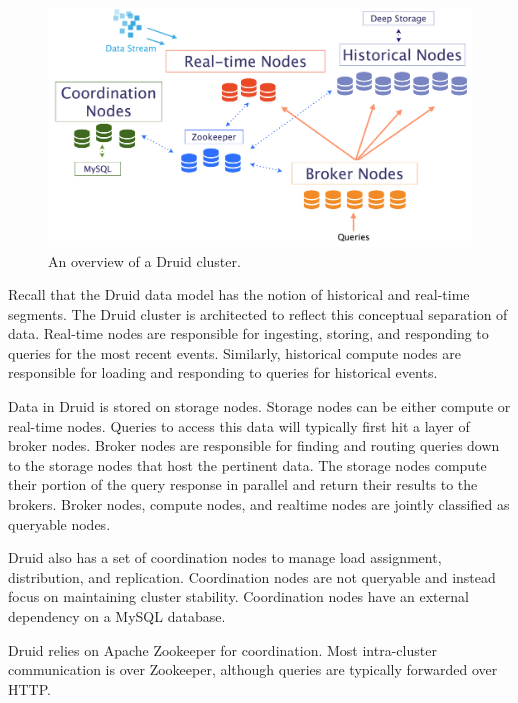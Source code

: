 \documentclass{vldb}
\begin{document}
\begin{figure}
\centering
\includegraphics[width = 4.5in]{druid_cluster}
\caption{An overview of a Druid cluster.}
\label{fig:druid_cluster}
\end{figure}

Recall that the Druid data model has the notion of historical and real-time segments. The Druid cluster is architected to reflect this
conceptual separation of data. Real-time nodes are responsible for
ingesting, storing, and responding to queries for the most recent
events. Similarly, historical compute nodes are responsible for
loading and responding to queries for historical events.

Data in Druid is stored on storage nodes. Storage nodes can be either
compute or real-time nodes.  Queries to access this data will
typically first hit a layer of broker nodes. Broker nodes are
responsible for finding and routing queries down to the storage nodes
that host the pertinent data. The storage nodes compute their portion
of the query response in parallel and return their results to the
brokers. Broker nodes, compute nodes, and realtime nodes are jointly
classified as queryable nodes.

Druid also has a set of coordination nodes to manage load assignment,
distribution, and replication. Coordination nodes are not queryable
and instead focus on maintaining cluster stability. Coordination nodes
have an external dependency on a MySQL database.

Druid relies on Apache Zookeeper \cite{hunt2010zookeeper} 
for coordination. Most intra-cluster communication is over Zookeeper, although
queries are typically forwarded over HTTP.
\end{document}
